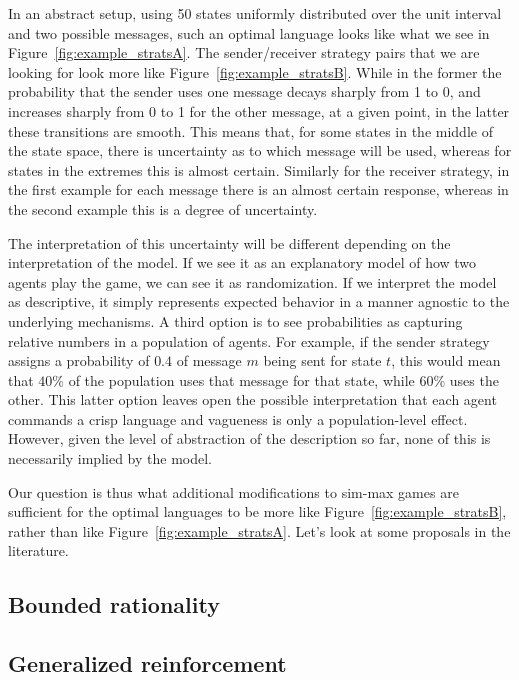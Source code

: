 \documentclass[a4paper]{article}
\begin{document}
In an abstract setup, using 50 states uniformly distributed over the unit interval and two possible messages, such an optimal language looks like what we see in Figure~\ref{fig:example_stratsA}.
The sender/receiver strategy pairs that we are looking for look more like Figure~\ref{fig:example_stratsB}.
While in the former the probability that the sender uses one message decays sharply from 1 to 0, and increases sharply from 0 to 1 for the other message, at a given point, in the latter these transitions are smooth.
This means that, for some states in the middle of the state space, there is uncertainty as to which message will be used, whereas for states in the extremes this is almost certain.
Similarly for the receiver strategy, in the first example for each message there is an almost certain response, whereas in the second example this is a degree of uncertainty.

The interpretation of this uncertainty will be different depending on the interpretation of the model.
If we see it as an explanatory model of how two agents play the game, we can see it as randomization.
If we interpret the model as descriptive, it simply represents expected behavior in a manner agnostic to the underlying mechanisms.
A third option is to see probabilities as capturing relative numbers in a population of agents.
For example, if the sender strategy assigns a probability of $0.4$ of message $m$ being sent for state $t$, this would mean that $40\%$ of the population uses that message for that state, while $60\%$ uses the other.
This latter option leaves open the possible interpretation that each agent commands a crisp language and vagueness is only a population-level effect.
However, given the level of abstraction of the description so far, none of this is necessarily implied by the model.

Our question is thus what additional modifications to sim-max games are sufficient for the optimal languages to be more like Figure~\ref{fig:example_stratsB}, rather than like Figure~\ref{fig:example_stratsA}.
Let's look at some proposals in the literature.

\subsection{Bounded rationality}
\parencite{franke_vagueness_2010}

\subsection{Generalized reinforcement}
\parencite{oconnor_evolution_2014}
\end{document}
